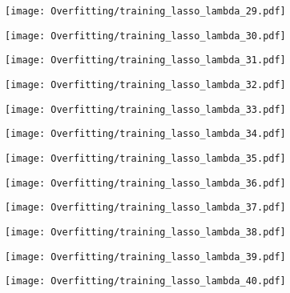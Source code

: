 \documentclass[xcolor=pdftex,dvipsnames,table]{beamer}
\begin{document}
\frame
{
	\begin{center}
		\texttt{[image: Overfitting/training\_lasso\_lambda\_29.pdf]}
	\end{center}
}

\frame
{
	\begin{center}
		\texttt{[image: Overfitting/training\_lasso\_lambda\_30.pdf]}
	\end{center}
}

\frame
{
	\begin{center}
		\texttt{[image: Overfitting/training\_lasso\_lambda\_31.pdf]}
	\end{center}
}

\frame
{
	\begin{center}
		\texttt{[image: Overfitting/training\_lasso\_lambda\_32.pdf]}
	\end{center}
}

\frame
{
	\begin{center}
		\texttt{[image: Overfitting/training\_lasso\_lambda\_33.pdf]}
	\end{center}
}

\frame
{
	\begin{center}
		\texttt{[image: Overfitting/training\_lasso\_lambda\_34.pdf]}
	\end{center}
}

\frame
{
	\begin{center}
		\texttt{[image: Overfitting/training\_lasso\_lambda\_35.pdf]}
	\end{center}
}

\frame
{
	\begin{center}
		\texttt{[image: Overfitting/training\_lasso\_lambda\_36.pdf]}
	\end{center}
}

\frame
{
	\begin{center}
		\texttt{[image: Overfitting/training\_lasso\_lambda\_37.pdf]}
	\end{center}
}

\frame
{
	\begin{center}
		\texttt{[image: Overfitting/training\_lasso\_lambda\_38.pdf]}
	\end{center}
}

\frame
{
	\begin{center}
		\texttt{[image: Overfitting/training\_lasso\_lambda\_39.pdf]}
	\end{center}
}

\frame
{
	\begin{center}
		\texttt{[image: Overfitting/training\_lasso\_lambda\_40.pdf]}
	\end{center}
}
\end{document}
